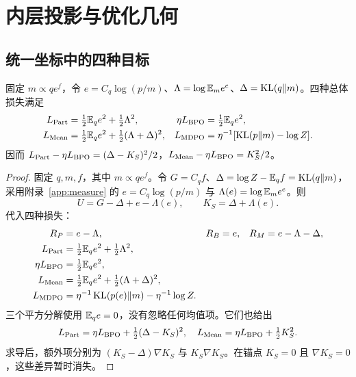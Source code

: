 \chapter{内层投影与优化几何}
\label{app:inner}
\section{统一坐标中的四种目标}
\begin{proposition}[四种内层损失的统一分解]
固定 $m\propto qe^f$，令 $e=C_q\log(p/m)$、$\Lambda=\log\mathbb E_me^e$、$\Delta=\operatorname{KL}(q\Vert m)$。四种总体损失满足
\begin{align}
L_{\rm Part}&=\tfrac12\mathbb E_qe^2+\tfrac12\Lambda^2,&
\eta L_{\rm BPO}&=\tfrac12\mathbb E_qe^2,\\
L_{\rm Mean}&=\tfrac12\mathbb E_qe^2+\tfrac12(\Lambda+\Delta)^2,&
L_{\rm MDPO}&=\eta^{-1}[\operatorname{KL}(p\Vert m)-\log Z].
\end{align}
因而 $L_{\rm Part}-\eta L_{\rm BPO}=(\Delta-K_S)^2/2$，$L_{\rm Mean}-\eta L_{\rm BPO}=K_S^2/2$。
\end{proposition}
\begin{proof}
固定 $q,m,f$，其中 $m\propto qe^f$。令 $G=C_qf$、$\Delta=\log Z-\mathbb E_qf=\operatorname{KL}(q\Vert m)$，采用附录~\ref{app:measure} 的 $e=C_q\log(p/m)$ 与 $\Lambda(e)=\log\mathbb E_me^e$。则
\begin{equation}
U=G-\Delta+e-\Lambda(e),\qquad K_S=\Delta+\Lambda(e).
\end{equation}
代入四种损失：
\begin{align}
R_P&=e-\Lambda,& R_B&=e,&R_M&=e-\Lambda-\Delta,\\
L_{\rm Part}&=\tfrac12\mathbb E_qe^2+\tfrac12\Lambda^2,\\
\eta L_{\rm BPO}&=\tfrac12\mathbb E_qe^2,\\
L_{\rm Mean}&=\tfrac12\mathbb E_qe^2+\tfrac12(\Lambda+\Delta)^2,\\
L_{\rm MDPO}&=\eta^{-1}\operatorname{KL}(p(e)\Vert m)-\eta^{-1}\log Z.
\end{align}
三个平方分解使用 $\mathbb E_qe=0$，没有忽略任何均值项。它们也给出
\begin{equation}
L_{\rm Part}=\eta L_{\rm BPO}+\tfrac12(\Delta-K_S)^2,\quad
L_{\rm Mean}=\eta L_{\rm BPO}+\tfrac12K_S^2.
\end{equation}
求导后，额外项分别为 $(K_S-\Delta)\nabla K_S$ 与 $K_S\nabla K_S$。在锚点 $K_S=0$ 且 $\nabla K_S=0$，这些差异暂时消失。
\end{proof}

